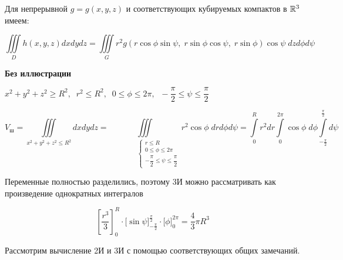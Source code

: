 \documentclass[../../main.tex]{subfiles}
\begin{document}
\begin{exmp}
\begin{itemize}
			Для непрерывной $g=g(x, y, z)$ и соответствующих
			кубируемых компактов в $\mathbb{R}^3$ имеем:
			
			\begin{equation}
			\label{lec15:45}
			\iiint\limits_{D} h(x, y, z) dx dy dz=
			\iiint\limits_{G} r^2g(r \cos{\phi} \sin{\psi},\; r \sin{\phi} \cos{\psi},\;
			 r \sin{\phi})\cos{\psi}\; dz d\phi d\psi
			\end{equation}
			
		\end{itemize}
	\end{exmp}

	\begin{exmp}
		\textbf{Без иллюстрации}
		
		
		$x^2 + y^2 + z^2 \geq R^2, \;\; r^2 \leq R^2, \;\; 0 \leq \phi \leq 2\pi, \;\; -\dfrac{\pi}{2} \leq \psi \leq \dfrac{\pi}{2}$
		
		\[V_{\text{ш}} = \iiint\limits_{x^2 + y^2 + z^2 \leq R^2} dxdydz = \iiint\limits_{
			\;\;\;\;\;\;\;\;\;\;\;\;\;\;\;\;\;
			\begin{cases}
			r \leq R\\
			0 \leq \phi \leq 2\pi\\
			-\dfrac{\pi}{2} \leq \psi \leq \dfrac{\pi}{2}
			\end{cases}
		}r^2\cos \phi \; dr d\phi d\psi = \int\limits_{0}^{R}r^2dr\int\limits_{0}^
	{2\pi}\cos\phi \; d\phi \int\limits_{-\frac{\pi}{2}}^{\frac{\pi}{2}}d\psi\]
		
		Переменные полностью разделились, поэтому 3И можно рассматривать как произведение
		 однократных интегралов
		
		\[
		\left[\dfrac{r^3}{3}\right]_{0}^{R} \cdot \Big[\sin \psi \Big]_{-\frac{\pi}{2}}^{\frac{\pi}{2}} \cdot \Big[\phi\Big]_{0}^{2\pi} = 
		\dfrac{4}{3} \pi R^3 
		\]
	\end{exmp}
	
	Рассмотрим вычисление 2И и 3И с помощью соответствующих общих замечаний. 
	
\end{document}
